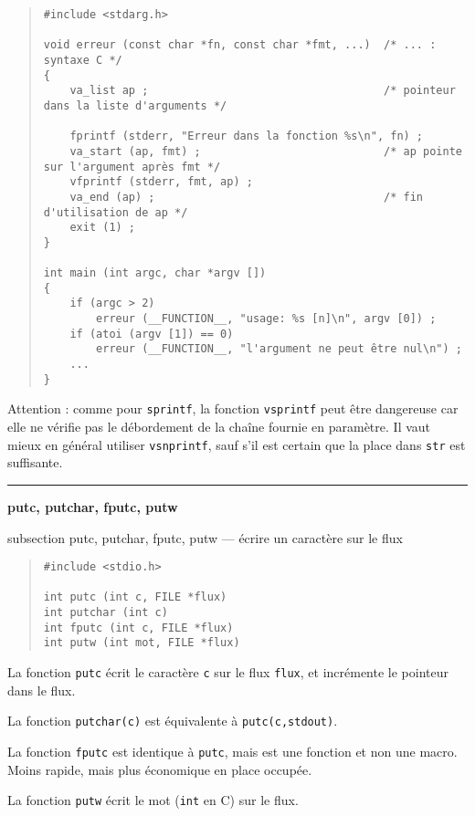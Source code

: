 \documentclass [twoside] {report}
\newcommand {\primitive} [1]
    {
	\phantomsection
	{\large \textbf {#1}}
	\addcontentsline {toc} {subsection} {#1}
    }
\newcommand {\separation}
    {
	\vspace {5mm}
	\nopagebreak
	\hrule
    }
\begin{document}
\begin {quote}
\small
\begin {verbatim}
#include <stdarg.h>

void erreur (const char *fn, const char *fmt, ...)  /* ... : syntaxe C */
{
    va_list ap ;                                    /* pointeur dans la liste d'arguments */

    fprintf (stderr, "Erreur dans la fonction %
    va_start (ap, fmt) ;                            /* ap pointe sur l'argument après fmt */
    vfprintf (stderr, fmt, ap) ;
    va_end (ap) ;                                   /* fin d'utilisation de ap */
    exit (1) ;
}

int main (int argc, char *argv [])
{
    if (argc > 2)
        erreur (__FUNCTION__, "usage: %
    if (atoi (argv [1]) == 0)
        erreur (__FUNCTION__, "l'argument ne peut être nul\n") ;
    ...
}
\end{verbatim}
\end {quote}

Attention : comme pour \texttt{sprintf}, la fonction \texttt{vsprintf}
peut être dangereuse car elle ne vérifie pas le débordement de
la chaîne fournie en paramètre. Il vaut mieux en général utiliser
\texttt{vsnprintf}, sauf s'il est certain que la place dans \texttt{str}
est suffisante.


\separation
\primitive {putc, putchar, fputc, putw} --- écrire un caractère sur le flux

\begin {quote}
\begin {verbatim}
#include <stdio.h>

int putc (int c, FILE *flux)
int putchar (int c)
int fputc (int c, FILE *flux)
int putw (int mot, FILE *flux)
\end{verbatim}
\end {quote}

La fonction \texttt {putc} écrit le caractère \texttt {c} sur le flux
\texttt {flux}, et incrémente le pointeur dans le flux.

La fonction \texttt {putchar(c)} est équivalente à \texttt {putc(c,stdout)}.

La fonction \texttt {fputc} est identique à \texttt {putc}, mais est une
fonction et non une macro. Moins rapide, mais plus
économique en place occupée.

La fonction \texttt {putw} écrit le mot (\texttt {int} en C) sur le flux.
\end{document}
